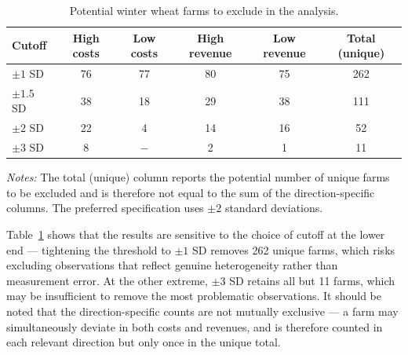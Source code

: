 \documentclass[12pt]{article}
\begin{document}
\begin{table}[H]
\centering
\caption{Potential winter wheat farms to exclude in the analysis.}
\label{tab:outlier-robustness-wheat}
\begin{threeparttable}
\begin{tabular}{lccccc}
\toprule
Cutoff & High costs & Low costs & High revenue & Low revenue & Total (unique) \\
\midrule
$\pm 1$ SD   & 76 & 77 & 80 & 75 & 262 \\
$\pm 1.5$ SD & 38 & 18 & 29 & 38 & 111 \\
$\pm 2$ SD   & 22 &  4 & 14 & 16 & 52 \\
$\pm 3$ SD   &  8 & $-$ &  2 &  1 & 11 \\
\bottomrule
\end{tabular}
\begin{tablenotes}
\small
\item \textit{Notes:} 
The total (unique) column reports the potential number of unique farms to be excluded and is therefore not equal to the sum of the direction-specific columns.
The preferred specification uses $\pm 2$ standard deviations.
\end{tablenotes}
\end{threeparttable}
\end{table}

Table~\ref{tab:outlier-robustness-wheat} shows that the results are sensitive to the choice of cutoff at the lower end --- tightening the threshold to $\pm 1$ SD removes 262 unique farms, which risks excluding observations that reflect genuine heterogeneity rather than measurement error.
At the other extreme, $\pm 3$ SD retains all but 11 farms, which may be insufficient to remove the most problematic observations.
It should be noted that the direction-specific counts are not mutually exclusive --- a farm may simultaneously deviate in both costs and revenues, and is therefore counted in each relevant direction but only once in the unique total.
\end{document}
